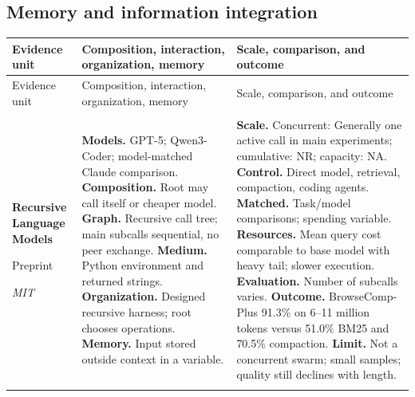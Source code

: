 \subsection{Memory and information integration}
\begingroup
\small
\setlength{\tabcolsep}{5pt}
\renewcommand{\arraystretch}{1.13}
\begin{longtable}{@{}>{\raggedright\arraybackslash}p{}>{\raggedright\arraybackslash}p{}>{\raggedright\arraybackslash}p{}@{}}
\toprule
Evidence unit & Composition, interaction, organization, memory & Scale, comparison, and outcome \\
\midrule
\endfirsthead
\toprule
Evidence unit & Composition, interaction, organization, memory & Scale, comparison, and outcome \\
\midrule
\endhead
\midrule
\multicolumn{3}{r}{Continued on next page}\\
\endfoot
\bottomrule
\endlastfoot
\textbf{Recursive Language Models}\par \citep{recursive-language-models}\par Preprint\par\emph{MIT} & \textbf{Models.} GPT-5; Qwen3-Coder; model-matched Claude comparison. \textbf{Composition.} Root may call itself or cheaper model. \textbf{Graph.} Recursive call tree; main subcalls sequential, no peer exchange. \textbf{Medium.} Python environment and returned strings. \textbf{Organization.} Designed recursive harness; root chooses operations. \textbf{Memory.} Input stored outside context in a variable. & \textbf{Scale.} Concurrent: Generally one active call in main experiments; cumulative: NR; capacity: NA. \textbf{Control.} Direct model, retrieval, compaction, coding agents. \textbf{Matched.} Task/model comparisons; spending variable. \textbf{Resources.} Mean query cost comparable to base model with heavy tail; slower execution. \textbf{Evaluation.} Number of subcalls varies. \textbf{Outcome.} BrowseComp-Plus 91.3\% on 6--11 million tokens versus 51.0\% BM25 and 70.5\% compaction. \textbf{Limit.} Not a concurrent swarm; small samples; quality still declines with length. \\ \addlinespace[5pt]

\end{longtable}
